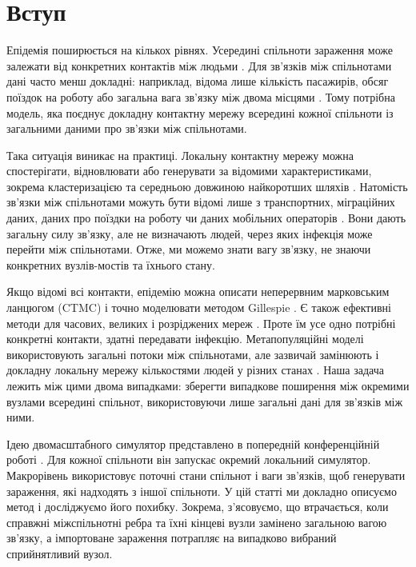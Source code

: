 \section{Вступ}
\label{sec:introduction}

Епідемія поширюється на кількох рівнях. Усередині спільноти зараження може залежати від конкретних контактів між людьми \citep{keeling2005,pastorsatorras2015,kiss2017}. Для зв'язків між спільнотами дані часто менш докладні: наприклад, відома лише кількість пасажирів, обсяг поїздок на роботу або загальна вага зв'язку між двома місцями \citep{balcan2009,barbosa2018human}. Тому потрібна модель, яка поєднує докладну контактну мережу всередині кожної спільноти із загальними даними про зв'язки між спільнотами.

Така ситуація виникає на практиці. Локальну контактну мережу можна спостерігати, відновлювати або генерувати за відомими характеристиками, зокрема кластеризацією та середньою довжиною найкоротших шляхів \citep{eubank2004,danon2011}. Натомість зв'язки між спільнотами можуть бути відомі лише з транспортних, міграційних даних, даних про поїздки на роботу чи даних мобільних операторів \citep{barbosa2018human,chang2021}. Вони дають загальну силу зв'язку, але не визначають людей, через яких інфекція може перейти між спільнотами. Отже, ми можемо знати вагу зв'язку, не знаючи конкретних вузлів-мостів та їхнього стану.

Якщо відомі всі контакти, епідемію можна описати неперервним марковським ланцюгом (CTMC) і точно моделювати методом Gillespie \citep{gillespie1977exact,gibson2000}. Є також ефективні методи для часових, великих і розріджених мереж \citep{vestergaard2015,kuryliak2025simulating}. Проте їм усе одно потрібні конкретні контакти, здатні передавати інфекцію. Метапопуляційні моделі використовують загальні потоки між спільнотами, але зазвичай замінюють і докладну локальну мережу кількостями людей у різних станах \citep{colizza2007reaction,colizza2008,balcan2010modeling,ajelli2010}. Наша задача лежить між цими двома випадками: зберегти випадкове поширення між окремими вузлами всередині спільнот, використовуючи лише загальні дані для зв'язків між ними.

Ідею двомасштабного симулятор представлено в попередній конференційній роботі \citep{kuryliak2025towards}. Для кожної спільноти він запускає окремий локальний симулятор. Макрорівень використовує поточні стани спільнот і ваги зв'язків, щоб генерувати зараження, які надходять з іншої спільноти. У цій статті ми докладно описуємо метод і досліджуємо його похибку. Зокрема, з'ясовуємо, що втрачається, коли справжні міжспільнотні ребра та їхні кінцеві вузли замінено загальною вагою зв'язку, а імпортоване зараження потрапляє на випадково вибраний сприйнятливий вузол.

